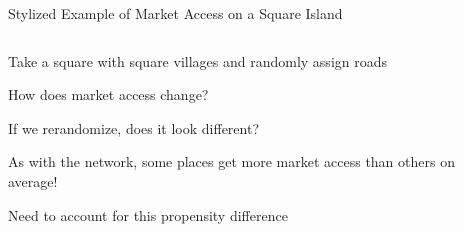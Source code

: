 \documentclass[notes,11pt, aspectratio=169]{beamer}
\newenvironment{wideitemize}{\itemize\addtolength{\itemsep}{10pt}}{\enditemize}
\begin{document}
\begin{frame}{ Stylized Example of Market Access on a Square Island}
\begin{columns}[T] %
\begin{column}{.55\textwidth}
  \begin{wideitemize}
  \item Take a square with square villages and randomly assign roads
  \item How does market access change?
  \item<2-> If we rerandomize, does it look different?
  \item<3-> As with the network, some places get more market access than others on average!
    \item<3-> Need to account for this propensity difference
  \end{wideitemize}
\end{column}%
\hfill%
\begin{column}{.45\textwidth}
\end{column}
\end{columns}
\end{frame}
\end{document}
